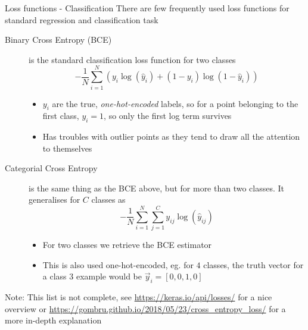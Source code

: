     \begin{frame}{Loss functions - Classification}
      \enlargethispage{1cm}
      There are few frequently used loss functions for standard regression and classification task
      \begin{description}
        \item[Binary Cross Entropy (BCE)] is the standard classification loss function for two classes
          \begin{equation*}
            - \frac{1}{N} \sum_{i=1}^N \left(
              y_i \log(\hat{y}_i) + (1 - y_i) \log(1 - \hat{y}_i) \right)
          \end{equation*}
          \begin{itemize}
            \item $y_i$ are the true, \emph{one-hot-encoded} labels, so for a point belonging to the first class, $y_i = 1$, so only the first log term survives
            \item Has troubles with outlier points as they tend to draw all the attention to themselves
          \end{itemize}
        \item[Categorial Cross Entropy] is the same thing as the BCE above, but for more than two classes.
        It generalises for $C$ classes as
          \begin{equation*}
            - \frac{1}{N}\sum_{i=1}^N \sum_{j=1}^C y_{ij} \log(\hat{y}_{ij})
          \end{equation*}
          \begin{itemize}
            \item For two classes we retrieve the BCE estimator
            \item This is also used one-hot-encoded, eg. for $4$ classes, the truth vector for a class $3$ example would be $\vec{y}_i = [0, 0, 1, 0]$
          \end{itemize}
      \end{description}
      Note: This list is not complete, see \url{https://keras.io/api/losses/} for a nice overview or \url{https://gombru.github.io/2018/05/23/cross_entropy_loss/} for a more in-depth explanation
    \end{frame}


